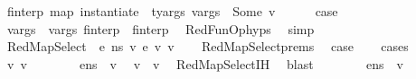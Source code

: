 \begin{isabellebody}
\ {\isachardoublequoteopen}f{\isacharunderscore}{\kern0pt}interp{\isacharprime}{\kern0pt}\ {\isacharparenleft}{\kern0pt}map\ {\isacharparenleft}{\kern0pt}instantiate\ {\isasymOmega}{\isacharparenright}{\kern0pt}\ ty{\isacharunderscore}{\kern0pt}args{\isacharparenright}{\kern0pt}\ v{\isacharunderscore}{\kern0pt}args{\isacharprime}{\kern0pt}\ {\isacharequal}{\kern0pt}\ Some\ v{\isacharprime}{\kern0pt}{\isachardoublequoteclose}\isanewline
\ \ \ \ \isamarkupfalse%
\ {\isacharquery}{\kern0pt}case\ \isamarkupfalse%
\ {\isacartoucheopen}v{\isacharunderscore}{\kern0pt}args\ {\isacharequal}{\kern0pt}\ v{\isacharunderscore}{\kern0pt}args{\isacharprime}{\kern0pt}{\isacartoucheclose}\ {\isacartoucheopen}f{\isacharunderscore}{\kern0pt}interp\ {\isacharequal}{\kern0pt}\ f{\isacharunderscore}{\kern0pt}interp{\isacharprime}{\kern0pt}{\isacartoucheclose}\ \isamarkupfalse%
\ RedFunOp{\isachardot}{\kern0pt}hyps\ \isamarkupfalse%
\ simp\isanewline
\ \ \isamarkupfalse%
\isanewline
{}\isamarkupfalse%
\ \ \ \ \ \ \ \ \ \ \isanewline
\ \ \isamarkupfalse%
\ {\isacharparenleft}{\kern0pt}RedMapSelect\ {\isasymOmega}\ e{}\ n{\isacharunderscore}{\kern0pt}s\ v{}\ e{}\ v{}\ v{\isacharparenright}{\kern0pt}\isanewline
\ \ \isamarkupfalse%
\ RedMapSelect{\isachardot}{\kern0pt}prems\ \isamarkupfalse%
\ {\isacharquery}{\kern0pt}case\isanewline
\ \ \isamarkupfalse%
\ {\isacharparenleft}{\kern0pt}cases{\isacharparenright}{\kern0pt}\isanewline
\ \ \ \ \isamarkupfalse%
\ v{}{\isacharprime}{\kern0pt}\ v{}{\isacharprime}{\kern0pt}\isanewline
\ \ \ \ \isamarkupfalse%
\ {\isachardoublequoteopen}{\isasymLambda}{\isacharcomma}{\kern0pt}{\isasymGamma}{\isacharcomma}{\kern0pt}{\isasymOmega}\ {\isasymturnstile}\ {\isasymlangle}e{}{\isacharcomma}{\kern0pt}n{\isacharunderscore}{\kern0pt}s{\isasymrangle}\ {\isasymDown}\ v{}{\isacharprime}{\kern0pt}{\isachardoublequoteclose}\ \isamarkupfalse%
\ {\isachardoublequoteopen}v{}\ {\isacharequal}{\kern0pt}\ v{}{\isacharprime}{\kern0pt}{\isachardoublequoteclose}\ \isamarkupfalse%
\ RedMapSelect{\isachardot}{\kern0pt}IH\ \isamarkupfalse%
\ blast\isanewline
\ \ \ \ \isamarkupfalse%
\ {\isachardoublequoteopen}{\isasymLambda}{\isacharcomma}{\kern0pt}{\isasymGamma}{\isacharcomma}{\kern0pt}{\isasymOmega}\ {\isasymturnstile}\ {\isasymlangle}e{}{\isacharcomma}{\kern0pt}n{\isacharunderscore}{\kern0pt}s{\isasymrangle}\ {\isasymDown}\ v{}{\isacharprime}{\kern0pt}{\isachardoublequoteclose}\ \isamarkupfalse%

\end{isabellebody}
